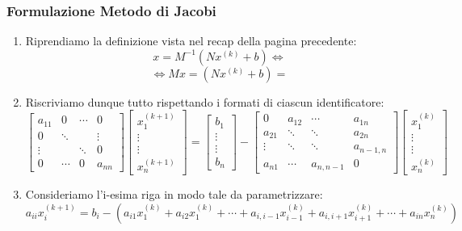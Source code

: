 \documentclass{article}
\begin{document}
    \subsubsection{Formulazione Metodo di Jacobi}
    \begin{enumerate}
        \item Riprendiamo la definizione vista nel recap della pagina precedente:
        \[ x = M^{-1}(Nx^{(k)} + b) \Leftrightarrow \]
        \vspace*{-12px}
        \[ \Leftrightarrow Mx = (Nx^{(k)} + b)  = \]
        \item Riscriviamo dunque tutto rispettando i formati di ciascun identificatore:
        \vspace*{8px}
        \[  \begin{bmatrix}
            a_{11} & 0 & \cdots & 0 \\
            0 & \ddots &  & \vdots \\
            \vdots &  & \ddots & 0 \\
            0 & \cdots & 0 & a_{nn}
            \end{bmatrix}
            \begin{bmatrix}
                x^{(k+1)}_{1} \\
                \vdots \\
                \vdots \\
                x^{(k+1)}_{n} 
            \end{bmatrix} 
            =
            \begin{bmatrix}
                b_{1} \\
                \vdots \\
                \vdots \\
                b_{n} 
            \end{bmatrix}
            -
            \begin{bmatrix}
                0 & a_{12} & \cdots & a_{1n} \\
                a_{21} & \ddots & \ddots & a_{2n} \\
                \vdots & \ddots & \ddots & a_{n-1,n} \\
                a_{n1} & \cdots & a_{n,n-1} & 0
            \end{bmatrix}
            \begin{bmatrix}
                x^{(k)}_{1} \\
                \vdots \\
                \vdots \\
                x^{(k)}_{n} 
            \end{bmatrix}
        \]
        \item Consideriamo l'i-esima riga in modo tale da parametrizzare:
        \[ a_{ii}x^{(k+1)}_{i} = b_{i} - ( a_{i1}x^{(k)}_{1} + a_{i2}x^{(k)}_{1} + \cdots + a_{i,i-1}x^{(k)}_{i-1} + a_{i,i+1}x^{(k)}_{i+1} + \cdots
        + a_{in}x^{(k)}_{n} ) \]


\end{enumerate}
\end{document}
